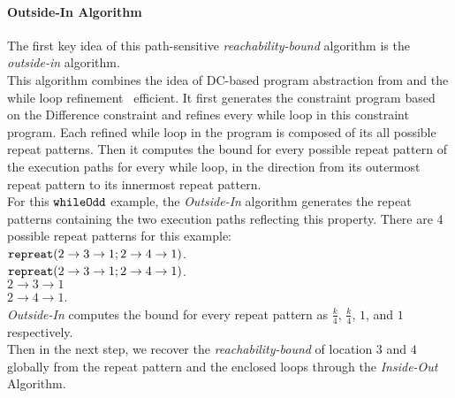 \paragraph*{Outside-In Algorithm}
The first key idea of this path-sensitive \emph{reachability-bound} algorithm is the \emph{outside-in} algorithm.
\\
This algorithm combines the idea of DC-based program abstraction from \cite{sinn2017complexity}
and the while loop refinement~\cite{GulwaniJK09} efficient.
It first generates the constraint program based on the Difference constraint and refines every while loop in this constraint program.
Each refined while loop in the program is composed of its all possible repeat patterns.
Then it
computes the bound for every possible repeat pattern of the execution paths for every while loop,
in the direction
from its outermost repeat pattern to its innermost repeat pattern.
\\
For this ${\mathtt{whileOdd}}$ example, the \emph{Outside-In} algorithm generates 
the repeat patterns containing the two execution paths reflecting this property.
There are 4 possible repeat patterns for this example:
\\
${\mathtt{repreat}}(2 \to 3 \to 1; 2 \to 4 \to 1)$.
\\
${\mathtt{repreat}}(2 \to 3 \to 1; 2 \to 4 \to 1)$.
\\
$2 \to 3 \to 1$
\\
$2 \to 4 \to 1$.
\\
\emph{Outside-In} computes the bound for every repeat pattern
as $\frac{k}{4}$, $\frac{k}{4}$, $1$, and $1$ respectively.
\\
Then in the next step, we recover the \emph{reachability-bound} of location $3$ and $4$ globally from the
repeat pattern and the enclosed loops through the \emph{Inside-Out} Algorithm.
